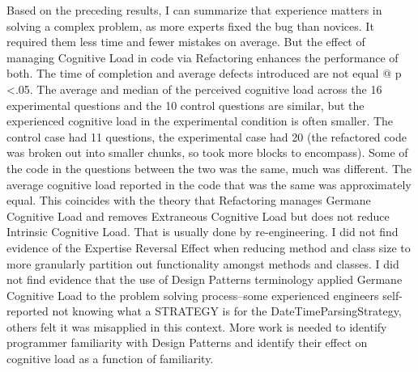 Based on the preceding results, I can summarize that experience matters in solving a complex problem, as more experts fixed the bug than novices. It required them less time and fewer mistakes on average. But the effect of managing Cognitive Load in code via Refactoring enhances the performance of both. The time of completion and average defects introduced are not equal @ p \textless .05. The average and median of the perceived cognitive load across the 16 experimental questions and the 10 control questions are similar, but the experienced cognitive load in the experimental condition is often smaller. The control case had 11 questions, the experimental case had 20 (the refactored code was broken out into smaller chunks, so took more blocks to encompass). Some of the code in the questions between the two was the same, much was different. The average cognitive load reported in the code that was the same was approximately equal. This coincides with the theory that Refactoring manages Germane Cognitive Load and removes Extraneous Cognitive Load but does not reduce Intrinsic Cognitive Load. That is usually done by re-engineering. I did not find evidence of the Expertise Reversal Effect when reducing method and class size to more granularly partition out functionality amongst methods and classes. I did not find evidence that the use of Design Patterns terminology applied Germane Cognitive Load to the problem solving process--some experienced engineers self-reported not knowing what a STRATEGY is for the DateTimeParsingStrategy, others felt it was misapplied in this context. More work is needed to identify programmer familiarity with Design Patterns and identify their effect on cognitive load as a function of familiarity.



